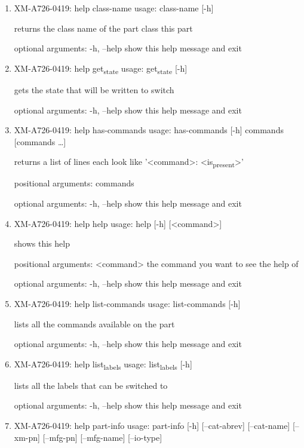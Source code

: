 \documentclass[11pt]{article}
\begin{document}
\begin{enumerate}
\item XM-A726-0419: help class-name
\label{sec:org919759b}
usage: class-name [-h]

returns the class name of the part class this part

optional arguments:
  -h, --help  show this help message and exit

\item XM-A726-0419: help get\textsubscript{state}
\label{sec:orge69df7a}
usage: get\textsubscript{state} [-h]

gets the state that will be written to switch

optional arguments:
  -h, --help  show this help message and exit

\item XM-A726-0419: help has-commands
\label{sec:org761eb7b}
usage: has-commands [-h] commands [commands \ldots{}]

returns a list of lines each look like '<command>: <is\textsubscript{present}>'

positional arguments:
  commands

optional arguments:
  -h, --help  show this help message and exit

\item XM-A726-0419: help help
\label{sec:org4ec31d1}
usage: help [-h] [<command>]

shows this help

positional arguments:
  <command>   the command you want to see the help of

optional arguments:
  -h, --help  show this help message and exit

\item XM-A726-0419: help list-commands
\label{sec:org63bd33f}
usage: list-commands [-h]

lists all the commands available on the part

optional arguments:
  -h, --help  show this help message and exit

\item XM-A726-0419: help list\textsubscript{labels}
\label{sec:orgd1c8124}
usage: list\textsubscript{labels} [-h]

lists all the labels that can be switched to

optional arguments:
  -h, --help  show this help message and exit

\item XM-A726-0419: help part-info
\label{sec:org061ca28}
usage: part-info  [-h] [--cat-abrev] [--cat-name] [--xm-pn] [--mfg-pn] [--mfg-name]
        [--io-type]


\end{enumerate}
\end{document}
